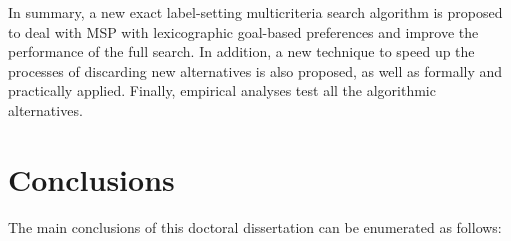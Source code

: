 In summary, a new exact label-setting multicriteria search algorithm is proposed to deal with MSP with lexicographic goal-based preferences and improve the performance of the full search. In addition, a new technique to speed up the processes of discarding new alternatives is also proposed, as well as formally and practically applied. Finally, empirical analyses test all the algorithmic alternatives. 

\section{Conclusions}
\label{ChapConclusions:sec:conclusions}

The main conclusions of this doctoral dissertation can be enumerated as follows:

